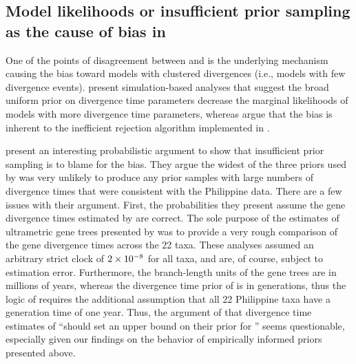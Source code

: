 \documentclass[letterpaper,12pt]{article}
\begin{document}
\begin{linenumbers}
\section*{Model likelihoods or insufficient prior sampling as the cause of bias
in \msb}
One of the points of disagreement between \citet{Hickerson2013} and
\citet{Oaks2012} is the underlying mechanism causing the bias toward models
with clustered divergences (i.e., models with few divergence events).
\citet{Oaks2012} present simulation-based analyses that suggest the broad
uniform prior on divergence time parameters decrease the marginal likelihoods
of models with more divergence time parameters, whereas \citet{Hickerson2013}
argue that the bias is inherent to the inefficient rejection algorithm
implemented in \msb.

\citet{Hickerson2013} present an interesting probabilistic argument
 to show that insufficient prior sampling is to blame for the bias.
They argue the widest of the three priors used by \citet{Oaks2012} was very
unlikely to produce any prior samples with large numbers of divergence times
that were consistent with the Philippine data.
There are a few issues with their argument.
First, the probabilities they present assume the gene divergence times
estimated by \citet{Oaks2012} are correct.
The sole purpose of the estimates of ultrametric gene trees presented by
\citet{Oaks2012} was to provide a very rough comparison of the gene divergence
times across the 22 taxa.  These analyses assumed an arbitrary strict clock of
$2\times 10^{-8}$ for all taxa, and are, of course, subject to estimation error.
Furthermore, the branch-length units of the gene trees are in millions of
years, whereas the divergence time prior of \msb is in generations, thus the
logic of \citet{Hickerson2013} requires the additional assumption that all 22
Philippine taxa have a generation time of one year.
Thus, the argument of \citet{Hickerson2013} that divergence time estimates of
\citet{Oaks2012} ``should set an upper bound on their prior for \divt{}'' seems
questionable, especially given our findings on the behavior of empirically
informed priors presented above.


\end{linenumbers}
\end{document}
